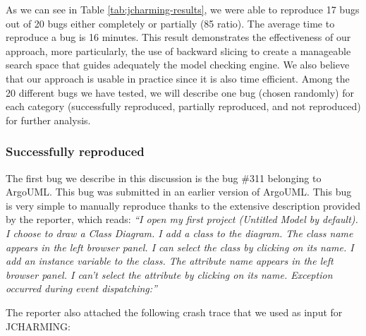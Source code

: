 As we can see in Table \ref{tab:jcharming-results}, we were able to reproduce 17 bugs
out of 20 bugs either completely or partially (85%
ratio). The average time to reproduce a bug is 16 minutes.
This result demonstrates the effectiveness of our approach,
more particularly, the use of backward slicing to create a
manageable search space that guides adequately the model
checking engine. We also believe that our approach is usable
in practice since it is also time efficient. Among the 20 different bugs we have tested, we will describe
one bug (chosen randomly) for each category (successfully
reproduced, partially reproduced, and not reproduced) for
further analysis.

\subsubsection{Successfully reproduced}

The first bug we describe in this discussion is the bug \#311
belonging to ArgoUML. This bug was submitted in an earlier
version of ArgoUML. This bug is very simple to manually
reproduce thanks to the extensive description provided by the
reporter, which reads: {\it ``I open my first project (Untitled Model by default). I choose
to draw a Class Diagram. I add a class to the diagram. The
class name appears in the left browser panel. I can select the
class by clicking on its name. I add an instance variable to the
class. The attribute name appears in the left browser panel. I
can't select the attribute by clicking on its name. Exception
occurred during event dispatching:''}

The reporter also attached the following crash trace that we
used as input for JCHARMING:


